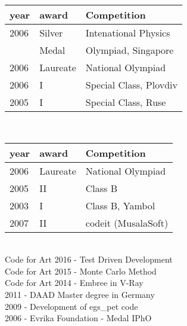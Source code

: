 \vspace{-0.4cm}
\begin{tabular}{ p{} p{} p{} }
year & award & Competition \\
\hline
2006 & Silver  & Intenational Physics \\
     & Medal   & Olympiad, Singapore  \\
2006 & Laureate& National Olympiad\\
2006 & I   & Special Class, Plovdiv  \\
2005 & I   & Special Class, Ruse     \\
\end{tabular}\\
\vspace{-0.4cm}
\begin{tabular}{ p{} p{} p{} }
year & award & Competition \\
\hline
2006 & Laureate  & National Olympiad \\
2005 & II        & Class B \\
2003 & I         & Class B, Yambol \\
2007 & II        & codeit (MusalaSoft)\\
\end{tabular}\\
\vspace{-0.4cm}
Code for Art 2016 - Test Driven Development \\
Code for Art 2015 - Monte Carlo Method \\
Code for Art 2014 - Embree in V-Ray\\
\vspace{-0.4cm}
2011 - DAAD Master degree in Germany \\
2009 - Development of egs\_pet code \\
2006 - Evrika Foundation - Medal IPhO\\
